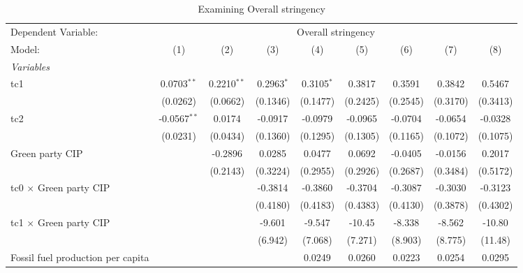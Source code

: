 
\begin{table}[htbp]
   \caption{Examining Overall stringency}
   \centering
   \begin{tabular}{lcccccccc}
      \tabularnewline \midrule \midrule
      Dependent Variable: & \multicolumn{8}{c}{Overall stringency}\\
      Model:                                  & (1)            & (2)           & (3)          & (4)          & (5)      & (6)      & (7)      & (8)\\  
      \midrule
      \emph{Variables}\\
      tc1                                     & 0.0703$^{**}$  & 0.2210$^{**}$ & 0.2963$^{*}$ & 0.3105$^{*}$ & 0.3817   & 0.3591   & 0.3842   & 0.5467\\   
                                              & (0.0262)       & (0.0662)      & (0.1346)     & (0.1477)     & (0.2425) & (0.2545) & (0.3170) & (0.3413)\\   
      tc2                                     & -0.0567$^{**}$ & 0.0174        & -0.0917      & -0.0979      & -0.0965  & -0.0704  & -0.0654  & -0.0328\\   
                                              & (0.0231)       & (0.0434)      & (0.1360)     & (0.1295)     & (0.1305) & (0.1165) & (0.1072) & (0.1075)\\   
      Green party CIP                         &                & -0.2896       & 0.0285       & 0.0477       & 0.0692   & -0.0405  & -0.0156  & 0.2017\\   
                                              &                & (0.2143)      & (0.3224)     & (0.2955)     & (0.2926) & (0.2687) & (0.3484) & (0.5172)\\   
      tc0 $\times$ Green party CIP            &                &               & -0.3814      & -0.3860      & -0.3704  & -0.3087  & -0.3030  & -0.3123\\   
                                              &                &               & (0.4180)     & (0.4183)     & (0.4383) & (0.4130) & (0.3878) & (0.4302)\\   
      tc1 $\times$ Green party CIP            &                &               & -9.601       & -9.547       & -10.45   & -8.338   & -8.562   & -10.80\\   
                                              &                &               & (6.942)      & (7.068)      & (7.271)  & (8.903)  & (8.775)  & (11.48)\\   
      Fossil fuel production per capita       &                &               &              & 0.0249       & 0.0260   & 0.0223   & 0.0254   & 0.0295\\   

\end{tabular}
\end{table}
